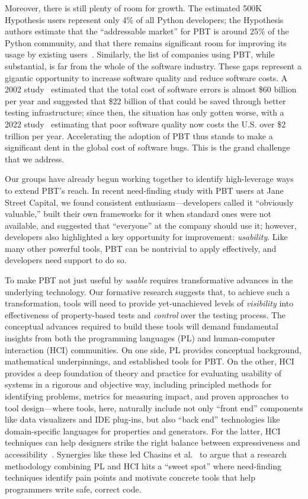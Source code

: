 Moreover, there is still plenty of room
for growth.
The estimated  500K
Hypothesis users represent only 4\% of all Python developers; the Hypothesis
authors estimate that the ``addressable market'' for PBT is around
25\% of the Python
community, and that there remains significant room for
improving its usage by existing users~\cite{ZacPersonalCommunication,noauthor_python_nodate}.
Similarly, the list of
companies using PBT, while substantial, is far from the whole of the software
industry.
These gaps represent a gigantic opportunity to increase software quality
and reduce software costs.
A 2002 study~\cite{2002economic} estimated that the total cost of software errors is almost
\$60 billion per year and suggested that \$22 billion of that could be
saved through
better testing infrastructure; since then, the situation has only gotten worse, with a 2022
study~\cite{krasner2022cost} estimating that poor software quality now
costs the U.S.{} over \$2 trillion per
year. Accelerating the adoption of PBT thus stands to make a
significant dent
in the global cost of software bugs.  This is the grand challenge that
we address.

Our groups have already begun working together to identify
high-leverage ways to extend PBT's reach.
In recent need-finding study with PBT users at Jane Street
Capital, we found consistent enthusiasm---developers called it
``obviously valuable,'' built their own
frameworks for it when standard ones were not available, and suggested that ``everyone''
at the company should use it; however, developers
also highlighted a key opportunity for improvement: {\em usability}.
%
Like
many other powerful tools, PBT can be nontrivial to apply effectively, and developers
need support to do so.

To make PBT not just useful by
\emph{usable} requires transformative advances in the underlying technology.
Our formative research suggests that, to achieve
such a transformation, tools will need to provide yet-unachieved levels of
\emph{visibility} into effectiveness of property-based tests and \emph{control}
over the testing process.
%
The conceptual advances required to build these tools
will demand fundamental insights from both the
programming languages (PL) and human-computer interaction (HCI)
communities.
On one side, PL provides conceptual background,
mathematical underpinnings, and established tools for PBT.  On the
other, HCI provides a deep foundation of theory and
practice for evaluating usability of systems in a
rigorous and objective way, including principled methods for
identifying problems, metrics for measuring impact, and proven
approaches to tool design---where tools, here, naturally include
not only ``front end'' components like
data visualizers and IDE plug-ins, but
also ``back end'' technologies like domain-specific languages for
properties and generators.  For the latter, HCI techniques
can help designers
strike the right balance between expressiveness and
accessibility~\cite{coblenz_pliers_2021,greenman_little_2022}.
Synergies like these led
Chasins et al.~\cite{chasins_pl_2021} to argue that a research
methodology combining PL and HCI hits a ``sweet spot'' where
need-finding techniques identify
pain points and motivate concrete tools that help programmers write
safe, correct code.

